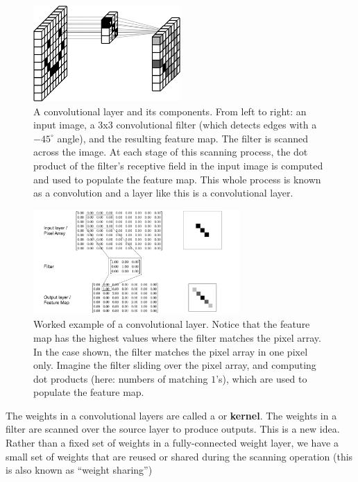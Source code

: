 \begin{figure}[h]
\centering
\includegraphics[width=0.5\textwidth]{images/happyConvolution.png}
\caption[Soraya Boza, adapting this image from User Cecbur, \url{https://commons.wikimedia.org/wiki/File:Convolutional_Neural_Network_NeuralNetworkFilter.gif}, with labels added by Jeff Yoshimi.]{A convolutional layer and its components. From left to right: an input image, a 3x3 convolutional filter (which detects edges with a $-45^\circ$ angle), and the resulting feature map. The filter is scanned across the image. At each stage of this scanning process, the dot product of the filter's receptive field in the input image is computed and used to populate the feature map. This whole process is known as a convolution and a layer like this is a convolutional layer.}
\label{cnn_filter}
\end{figure}

\begin{figure}[h]
\centering
\includegraphics[width=0.7\textwidth]{images/CNN_WorkedExample.png}
\caption[Jeff Yoshimi]{Worked example of a convolutional layer. Notice that the feature map has the highest values where the filter matches the pixel array. In the case shown, the filter matches the pixel array in one pixel only. Imagine the filter sliding over the pixel array, and computing dot products (here: numbers of matching $1$'s), which are used to populate the feature map.}
\label{cnn_workedExample}
\end{figure}

The weights in a convolutional layers are called a  or \textbf{kernel}. The weights in a filter are scanned over the source layer to produce outputs. This is a new idea. Rather than a fixed set of weights in a fully-connected weight layer, we have a small set of weights that are reused or shared during the scanning operation (this is also known as ``weight sharing'')

